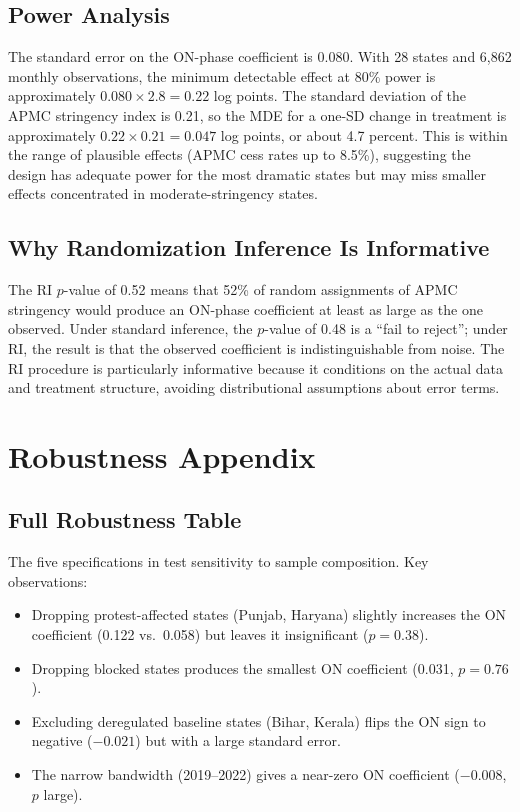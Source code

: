 \documentclass[12pt]{article}
\begin{document}
\subsection{Power Analysis}

The standard error on the ON-phase coefficient is 0.080. With 28 states and 6,862 monthly observations, the minimum detectable effect at 80\% power is approximately $0.080 \times 2.8 = 0.22$ log points. The standard deviation of the APMC stringency index is 0.21, so the MDE for a one-SD change in treatment is approximately $0.22 \times 0.21 = 0.047$ log points, or about 4.7 percent. This is within the range of plausible effects (APMC cess rates up to 8.5\%), suggesting the design has adequate power for the most dramatic states but may miss smaller effects concentrated in moderate-stringency states.

\subsection{Why Randomization Inference Is Informative}

The RI $p$-value of 0.52 means that 52\% of random assignments of APMC stringency would produce an ON-phase coefficient at least as large as the one observed. Under standard inference, the $p$-value of 0.48 is a ``fail to reject''; under RI, the result is that the observed coefficient is indistinguishable from noise. The RI procedure is particularly informative because it conditions on the actual data and treatment structure, avoiding distributional assumptions about error terms.


\section{Robustness Appendix}
\label{app:robustness}

\subsection{Full Robustness Table}

The five specifications in  test sensitivity to sample composition. Key observations:

\begin{itemize}
    \item Dropping protest-affected states (Punjab, Haryana) slightly increases the ON coefficient (0.122 vs.\ 0.058) but leaves it insignificant ($p = 0.38$).

    \item Dropping blocked states produces the smallest ON coefficient (0.031, $p = 0.76$).

    \item Excluding deregulated baseline states (Bihar, Kerala) flips the ON sign to negative ($-0.021$) but with a large standard error.

    \item The narrow bandwidth (2019--2022) gives a near-zero ON coefficient ($-0.008$, $p$ large).
\end{itemize}
\end{document}
